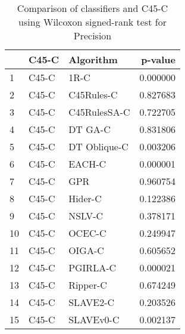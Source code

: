 \begin{table}
\footnotesize
\caption{Comparison of classifiers and C45-C using Wilcoxon signed-rank test for Precision}
\label{tab:C45-C wilcoxon Precision comparison}
\begin{tabular}{lllr}
\hline
 & C45-C & Algorithm & p-value \\
\hline
1 & C45-C & 1R-C & 0.000000 \\
2 & C45-C & C45Rules-C & 0.827683 \\
3 & C45-C & C45RulesSA-C & 0.722705 \\
4 & C45-C & DT GA-C & 0.831806 \\
5 & C45-C & DT Oblique-C & 0.003206 \\
6 & C45-C & EACH-C & 0.000001 \\
7 & C45-C & GPR & 0.960754 \\
8 & C45-C & Hider-C & 0.122386 \\
9 & C45-C & NSLV-C & 0.378171 \\
10 & C45-C & OCEC-C & 0.249947 \\
11 & C45-C & OIGA-C & 0.605652 \\
12 & C45-C & PGIRLA-C & 0.000021 \\
13 & C45-C & Ripper-C & 0.674249 \\
14 & C45-C & SLAVE2-C & 0.203526 \\
15 & C45-C & SLAVEv0-C & 0.002137 \\
\hline
\end{tabular}
\end{table}
